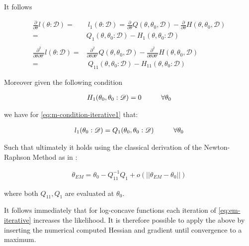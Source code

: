 \documentclass[11pt]{article}
\begin{document}
It follows

\begin{align} 
\frac{\partial}{\partial \theta} l (\theta: \mathscr{D}) =& \ l_1 (\theta: \mathscr{D}) = \frac{\partial}{\partial \theta} Q(\theta, \theta_0, \mathscr{D}) - \frac{\partial}{\partial \theta} H(\theta, \theta_0, \mathscr{D}) \nonumber \\
=& Q_1(\theta, \theta_0 : \mathscr{D}) - H_1(\theta, \theta_0 : \mathscr{D})  \label{eq:m-condition-iterative1} \\
\nonumber \\
\frac{\partial^2}{\partial \theta \partial \theta'} l (\theta: \mathscr{D}) =& \frac{\partial^2}{\partial \theta \partial \theta'}  Q(\theta, \theta_0, \mathscr{D}) -  \frac{\partial^2}{\partial \theta \partial \theta'}  H(\theta, \theta_0, \mathscr{D}) \nonumber \\
  =& \ Q_{11}(\theta, \theta_0 : \mathscr{D}) - H_{11}(\theta, \theta_0 : \mathscr{D}) \label{eq:m-condition-iterative2}
\end{align}

Moreover given the following condition

\begin{align} 
 H_1(\theta_0, \theta_0 : \mathscr{D})  = 0 \hspace*{1cm} \forall \theta_0 \label{eq:m-condition-entropy-iterative}
\end{align}

we have for \ref{eq:m-condition-iterative1} that:

\begin{align} 
 l_1(\theta_0: \mathscr{D})  = Q_1(\theta_0, \theta_0: \mathscr{D}) \hspace*{1cm} \forall \theta_0 \label{eq:m-condition-entropy-iterative2} 
\end{align}

Such that ultimately it holds using the classical derivation of the
Newton-Raphson Method as in \cite{storvik2007numerical}:


\begin{align} 
 \theta_{EM}  = \theta_{0} - Q_{11}^{-1} Q_1 + o(||\theta_{EM} - \theta_{0}||) \label{eq:em-iterative}
\end{align}

where both \(Q_{11}, Q_{1}\) are evaluated at \(\theta_0\).

It follows immediately that for log-concave functions each iteration
of \ref{eq:em-iterative} increases the likelihood. It is therefore
possible to apply the above by inserting the numerical computed
Hessian and gradient until convergence to a maximum.
\end{document}
